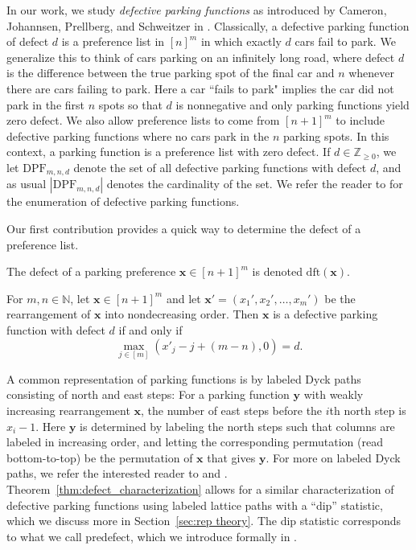 \documentclass[11pt,reqno]{BICA}
\theoremstyle{definition}
\newcommand{\DPF}{\mathrm{DPF}}
\newcommand{\x}{\mathbf{x}}
\newcommand{\y}{\mathbf{y}}
\newcommand{\de}{\mathrm{dft}}
\begin{document}
In our work, we study \textit{defective parking functions} as introduced by Cameron, Johannsen, Prellberg, and Schweitzer in  \cite{defective}. 
Classically, a defective parking function of defect $d$ is a preference list in $[n]^m$ in which exactly $d$ cars fail to park. 
We generalize this to think of cars parking on an infinitely long road, where defect $d$ is the difference between the true parking spot of the final car and $n$ whenever there are cars failing to park. Here a car ``fails to park" implies the car did not park in the first $n$ spots so that $d$ is nonnegative and only parking functions yield zero defect. 
We also allow preference lists to come from $[n+1]^m$ to include defective parking functions where no cars park in the $n$ parking spots.
In this context, a parking function is a preference list with zero defect. 
If $d \in \mathbb{Z}_{\geq0}$, we let $\DPF_{m,n,d}$ denote the set of all defective parking functions with defect $d$, and as usual $|\DPF_{m,n,d}|$ denotes the cardinality of the set.
We refer the reader to \cites{defective,butler2017parking} 
for the enumeration of defective parking functions.

Our first contribution provides a quick way to determine the defect of a  preference list.

\begin{definition}\label{def:dft}
    The defect of a parking preference $\x \in [n+1]^m$ is denoted $\de(\x)$.
\end{definition}

\begin{theorem}\label{thm:defect_characterization}
    For $m,n\in\mathbb{N}$, let $\x\in[n+1]^m$ and let $\x'=(x_1',x_2',\ldots,x_m')$ be the rearrangement of $\x$ into nondecreasing order. Then $\x$ is a defective parking function with defect $d$ if and only if \[\max_{j\in[m]}(x'_j-j+(m-n),0)=d.\]
\end{theorem} 

A common representation of parking functions is by labeled Dyck paths consisting of north and east steps: For a parking function $\y$ with weakly increasing rearrangement $\x$, the number of east steps before the $i$th north step is $x_i - 1$. Here $\y$ is determined by labeling the north steps such that columns are labeled in increasing order, and letting the corresponding permutation (read bottom-to-top) be the permutation of $\x$ that gives $\y$. For more on labeled Dyck paths, we refer the interested reader to \cite{adeniran-pudwell} and \cite{willigenburg-shuffle}. Theorem~\ref{thm:defect_characterization} allows for a similar characterization of defective parking functions using labeled lattice paths with a ``dip'' statistic, which we discuss more in Section~\ref{sec:rep theory}. The dip statistic corresponds to what we call predefect, which we introduce formally in . 
\end{document}
